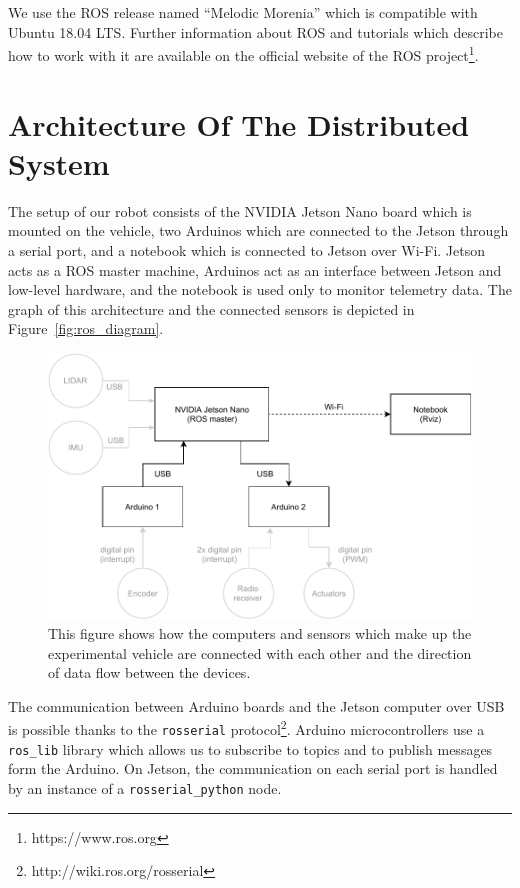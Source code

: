 We use the ROS release named ``Melodic Morenia'' which is compatible with Ubuntu 18.04 LTS. Further information about ROS and tutorials which describe how to work with it are available on the official website of the ROS project\footnote{https://www.ros.org}.

\section{Architecture Of The Distributed System}

The setup of our robot consists of the NVIDIA Jetson Nano board which is mounted on the vehicle, two Arduinos which are connected to the Jetson through a serial port, and a notebook which is connected to Jetson over Wi-Fi. Jetson acts as a ROS master machine, Arduinos act as an interface between Jetson and low-level hardware, and the notebook is used only to monitor telemetry data. The graph of this architecture and the connected sensors is depicted in Figure~\ref{fig:ros_diagram}.

\begin{figure}
	\centering
	\includegraphics[width=125mm]{../img/ros_diagram}
	\caption{This figure shows how the computers and sensors which make up the experimental vehicle are connected with each other and the direction of data flow between the devices.}
	\label{fig:rosdiagram}
\end{figure}

The communication between Arduino boards and the Jetson computer over USB is possible thanks to the \verb|rosserial| protocol\footnote{http://wiki.ros.org/rosserial}. Arduino microcontrollers use a \verb|ros_lib| library which allows us to subscribe to topics and to publish messages form the Arduino. On Jetson, the communication on each serial port is handled by an instance of a \verb|rosserial_python| node.

